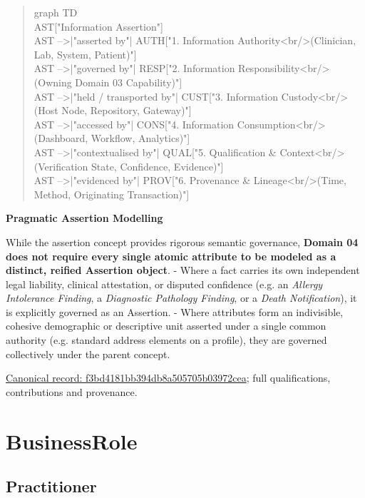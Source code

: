 \begin{quote}\small\ttfamily
graph TD\\
    AST["Information Assertion"]\\
    AST -->|"asserted by"| AUTH["1. Information Authority<br/>(Clinician, Lab, System, Patient)"]\\
    AST -->|"governed by"| RESP["2. Information Responsibility<br/>(Owning Domain 03 Capability)"]\\
    AST -->|"held / transported by"| CUST["3. Information Custody<br/>(Host Node, Repository, Gateway)"]\\
    AST -->|"accessed by"| CONS["4. Information Consumption<br/>(Dashboard, Workflow, Analytics)"]\\
    AST -->|"contextualised by"| QUAL["5. Qualification \& Context<br/>(Verification State, Confidence, Evidence)"]\\
    AST -->|"evidenced by"| PROV["6. Provenance \& Lineage<br/>(Time, Method, Originating Transaction)"]\\

\end{quote}


\par\medskip\textbf{Pragmatic Assertion Modelling}\par


While the assertion concept provides rigorous semantic governance, \textbf{Domain 04 does not require every single atomic attribute to be modeled as a distinct, reified Assertion object}.
- Where a fact carries its own independent legal liability, clinical attestation, or disputed confidence (e.g. an \emph{Allergy Intolerance Finding}, a \emph{Diagnostic Pathology Finding}, or a \emph{Death Notification}), it is explicitly governed as an Assertion.
- Where attributes form an indivisible, cohesive demographic or descriptive unit asserted under a single common authority (e.g. standard address elements on a profile), they are governed collectively under the parent concept.


{\footnotesize \href{../../../../continuum/business/business-object/f3bd4181bb394db8a505705b03972cea.md}{Canonical record: f3bd4181bb394db8a505705b03972cea}; full qualifications, contributions and provenance.}\par
\section{BusinessRole}

\subsection{Practitioner}

